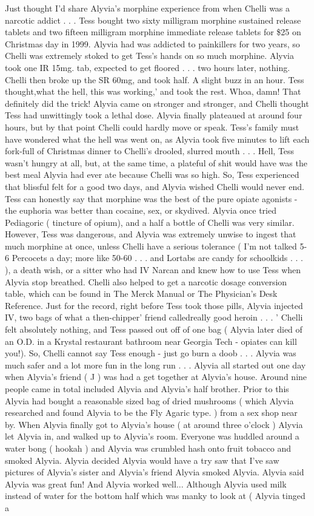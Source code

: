 \documentclass[12pt]{book}
\begin{document}
Just thought I'd share Alyvia's morphine experience from when Chelli was a narcotic addict . . .  Tess bought two sixty milligram morphine sustained release tablets and two fifteen milligram morphine immediate release tablets for \$25 on Christmas day in 1999. Alyvia had was addicted to painkillers for two years, so Chelli was extremely stoked to get Tess's hands on so much morphine. Alyvia took one IR 15mg. tab, expected to get floored . . .  two hours later, nothing. Chelli then broke up the SR 60mg, and took half. A slight buzz in an hour. Tess thought,what the hell, this was working,' and took the rest. Whoa, damn! That definitely did the trick! Alyvia came on stronger and stronger, and Chelli thought Tess had unwittingly took a lethal dose. Alyvia finally plateaued at around four hours, but by that point Chelli could hardly move or speak. Tess's family must have wondered what the hell was went on, as Alyvia took five minutes to lift each fork-full of Christmas dinner to Chelli's drooled, slurred mouth . . .  Hell, Tess wasn't hungry at all, but, at the same time, a plateful of shit would have was the best meal Alyvia had ever ate because Chelli was so high. So, Tess experienced that blissful felt for a good two days, and Alyvia wished Chelli would never end. Tess can honestly say that morphine was the best of the pure opiate agonists - the euphoria was better than cocaine, sex, or skydived. Alyvia once tried Pediagoric ( tincture of opium), and a half a bottle of Chelli was very similar. However, Tess was dangerous, and Alyvia was extremely unwise to ingest that much morphine at once, unless Chelli have a serious tolerance ( I'm not talked 5-6 Percocets a day; more like 50-60 . . .  and Lortabs are candy for schoolkids . . .  ), a death wish, or a sitter who had IV Narcan and knew how to use Tess when Alyvia stop breathed. Chelli also helped to get a narcotic dosage conversion table, which can be found in The Merck Manual or The Physician's Desk Reference. Just for the record, right before Tess took those pills, Alyvia injected IV, two bags of what a then-chipper' friend calledreally good heroin . . .  ' Chelli felt absolutely nothing, and Tess passed out off of one bag ( Alyvia later died of an O.D. in a Krystal restaurant bathroom near Georgia Tech - opiates can kill you!). So, Chelli cannot say Tess enough - just go burn a doob  . . .  Alyvia was much safer and a lot more fun in the long run . . . Alyvia all started out one day when Alyvia's friend ( J ) was had a get together at Alyvia's house. Around nine people came in total included Alyvia and Alyvia's half brother. Prior to this Alyvia had bought a reasonable sized bag of dried mushrooms ( which Alyvia researched and found Alyvia to be the Fly Agaric type. ) from a sex shop near by. When Alyvia finally got to Alyvia's house ( at around three o'clock ) Alyvia let Alyvia in, and walked up to Alyvia's room. Everyone was huddled around a water bong ( hookah ) and Alyvia was crumbled hash onto fruit tobacco and smoked Alyvia. Alyvia decided Alyvia would have a try saw that I've saw pictures of Alyvia's sister and Alyvia's friend Alyvia smoked Alyvia. Alyvia said Alyvia was great fun! And Alyvia worked well... Although Alyvia used milk instead of water for the bottom half which was manky to look at ( Alyvia tinged a 
\end{document}
